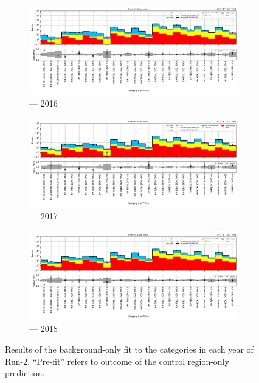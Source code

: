 \begin{figure}[htbp]
    \centering
    \begin{subfigure}[b]{0.79\textwidth}
        \includegraphics[width=\textwidth]{chapters/higgstoinv/figures/mountain_ranges/2016/ttH/SR_tree_fit_b-abs_values_ttH_cats.pdf}
        \caption{\ttH --- 2016}
    \end{subfigure}

    \begin{subfigure}[b]{0.79\textwidth}
        \includegraphics[width=\textwidth]{chapters/higgstoinv/figures/mountain_ranges/2017/ttH/SR_tree_fit_b-abs_values_ttH_cats.pdf}
        \caption{\ttH --- 2017}
    \end{subfigure}

    \begin{subfigure}[b]{0.79\textwidth}
        \includegraphics[width=\textwidth]{chapters/higgstoinv/figures/mountain_ranges/2018/ttH/SR_tree_fit_b-abs_values_ttH_cats.pdf}
        \caption{\ttH --- 2018}
    \end{subfigure}
    \caption[Results of the background-only fit to the \ttH categories in each year of Run-2]{Results of the background-only fit to the \ttH categories in each year of Run-2. ``Pre-fit'' refers to outcome of the control region-only prediction.}
    \label{fig:htoinv_mountain_range_B_only_ttH_SR}
\end{figure}

